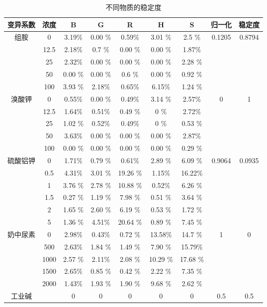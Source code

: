    \begin{table}[H]
    \centering
    \caption{不同物质的稳定度}
    \label{不同物质的稳定度}
    \begin{tabular}{@{}ccccccccc@{}}
    \toprule
    变异系数 & 浓度   & B    & G    & R     & H     & S     & 归一化  & 稳定度  \\ \midrule
    组胺   & 0    & 3.19\% & 0.00 \% & 0.59\%  & 3.01 \% & 2.5  \% & 0.1205
     & 0.8794 \\
         & 12.5 & 2.18\% & 0.7 \% & 0.00  \%  & 0.00    \% & 1.87\%  &      &      \\
         & 25   & 2.32\% & 0.00 \%   & 0.00 \%    & 0.00 \%    & 2.28 \% &      &      \\
         & 50   & 0.00 \%  & 0.00   \% & 0.6 \%  & 0.00  \%   & 0.92 \% &      &      \\
         & 100  & 3.93 \%& 2.18\% & 0.65\%  & 6.15\%  & 1.24 \% &      &      \\
    溴酸钾  & 0    & 0.55\% & 0.00   \% & 0.49\%  & 3.14 \% & 2.57\%  & 0    & 1    \\
         & 12.5 & 1.64\% & 0.51\% & 0.49 \% & 0 \%    & 2.72\%  &      &      \\
         & 25   & 1.02 \%& 0.52\% & 0.49\%  & 0  \%   & 0.53 \% &      &      \\
         & 50   & 3.63\% & 0.00   \% & 0.00 \%    & 0.00    \% & 2.87\%  &      &      \\
         & 100  & 0.00  \%  & 0.00   \% & 0.00   \%  & 0.00 \%    & 0.29 \% &      &      \\
    硫酸铝钾 & 0    & 1.71\% & 0.79 \%& 0.61\%  & 2.89 \% & 6.09 \% & 0.9064 & 0.0935 \\
         & 0.5  & 4.31\% & 3.01 \%& 19.26 \%& 1.15\%  & 16.22\% &      &      \\
         & 1    & 3.76 \%& 2.78 \%& 10.88 \%& 0.52\%  & 6.26 \% &      &      \\
         & 1.5  & 0.27 \%& 1.19 \%& 7.98  \%& 0.51 \% & 3.64 \% &      &      \\
         & 2    & 1.65 \%& 2.60  \%& 6.19  \%& 0.53 \% & 1.72 \% &      &      \\
         & 5    & 1.36 \%& 4.51\% & 20.64 \%& 0.89 \% & 7.45 \% &      &      \\
    奶中尿素 & 0    & 2.98\% & 0.43\% & 0.72 \% & 13.58\% & 14.7 \% & 1    & 0    \\
         & 500  & 2.63\% & 1.84 \%& 1.49 \% & 7.90  \% & 15.79\% &      &      \\
         & 1000 & 2.57 \%& 2.11\% & 2.08 \% & 10.29 \%& 17.68 \%&      &      \\
         & 1500 & 2.65\% & 0.85 \%& 0.42 \% & 2.22 \% & 7.35 \% &      &      \\
         & 2000 & 1.43\% & 1.93 \%& 1.90 \%  & 9.68 \% & 2.62  \%&      &      \\
    工业碱  & \null    & 0    & 0    & 0     & 0     & 0     & 0.5  & 0.5  \\ \bottomrule
    \end{tabular}
    \end{table}
    
